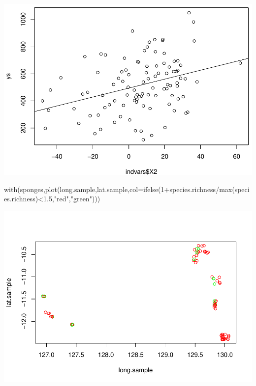 \documentclass[
]{book}
\newenvironment{Shaded}{\begin{snugshade}}{\end{snugshade}}
\newcommand{\AttributeTok}[1]{\textcolor[rgb]{0.77,0.63,0.00}{#1}}
\newcommand{\DecValTok}[1]{\textcolor[rgb]{0.00,0.00,0.81}{#1}}
\newcommand{\FloatTok}[1]{\textcolor[rgb]{0.00,0.00,0.81}{#1}}
\newcommand{\FunctionTok}[1]{\textcolor[rgb]{0.00,0.00,0.00}{#1}}
\newcommand{\NormalTok}[1]{#1}
\newcommand{\SpecialCharTok}[1]{\textcolor[rgb]{0.00,0.00,0.00}{#1}}
\newcommand{\StringTok}[1]{\textcolor[rgb]{0.31,0.60,0.02}{#1}}
\begin{document}
\includegraphics{ECOMODbook_files/figure-latex/unnamed-chunk-18-2.pdf}

\begin{Shaded}
\begin{Highlighting}[]
\FunctionTok{with}\NormalTok{(sponges,}\FunctionTok{plot}\NormalTok{(long.sample,lat.sample,}\AttributeTok{col=}\FunctionTok{ifelse}\NormalTok{(}\DecValTok{1}\SpecialCharTok{+}\NormalTok{species.richness}\SpecialCharTok{/}\FunctionTok{max}\NormalTok{(species.richness)}\SpecialCharTok{\textless{}}\FloatTok{1.5}\NormalTok{,}\StringTok{"red"}\NormalTok{,}\StringTok{"green"}\NormalTok{))) }
\end{Highlighting}
\end{Shaded}

\includegraphics{ECOMODbook_files/figure-latex/unnamed-chunk-18-3.pdf}
\end{document}
